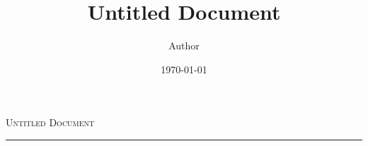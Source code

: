 \documentclass[12pt,a4paper]{scrartcl}
\title{Untitled Document}
\author{Author}
\date{\today}
\begin{document}
	\begin{center}\begin{large}\textsc{Untitled Document}\end{large}\end{center}
	\hrule
	
\end{document}
